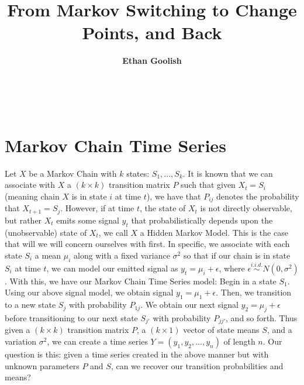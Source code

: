 \documentclass[a4paper]{amsproc}
\title[From Markov Switching to Change Points, and Back]{From Markov Switching to Change Points, and Back}
\author[Goolish]{\bfseries Ethan Goolish}
\theoremstyle{plain}
\theoremstyle{definition}
\theoremstyle{remark}
\numberwithin{equation}{section}
\begin{document}
	\vspace{18mm} \setcounter{page}{1} \thispagestyle{empty}
	
	\
	\maketitle
%	
	
	\section{Markov Chain Time Series}
	Let $X$ be a Markov Chain with $k$ states: $S_1, ..., S_k$. It is known that we can associate with $X$ a $(k \times k)$ transition matrix $P$ such that given $X_t = S_i$ (meaning chain $X$ is in state $i$ at time $t$), we have that $P_{ij}$ denotes the probability that $X_{t+1} = S_j$. However, if at time $t$, the state of $X_t$ is not directly observable, but rather $X_t$ emits some signal $y_t$ that probabilistically depends upon the (unobservable) state of $X_t$, we call $X$ a Hidden Markov Model. This is the case that will we will concern ourselves with first. In specific, we associate with each state $S_i$ a mean $\mu_i$ along with a fixed variance $\sigma^2$ so that if our chain is in state $S_i$ at time $t$, we can model our emitted signal as $y_t = \mu_i + \epsilon$, where $\epsilon \overset{i.i.d.}{\sim} N(0, \sigma^2)$. With this, we have our Markov Chain Time Series model: Begin in a state $S_1$. Using our above signal model, we obtain signal $y_1 = \mu_1 + \epsilon$. Then, we transition to a new state $S_j$ with probability $P_{1j}$. We obtain our next signal $y_2 = \mu_j + \epsilon$ before transitioning to our next state $S_{j'}$ with probability $P_{jj'}$, and so forth. Thus given a $(k \times k)$ transition matrix $P$, a $(k \times 1)$ vector of state means $S$, and a variation $\sigma^2$, we can create a time series $Y = (y_1, y_2, ..., y_n)$ of length $n$. Our question is this: given a time series created in the above manner but with unknown parameters $P$ and $S$, can we recover our transition probabilities and means? 
	
\end{document}
